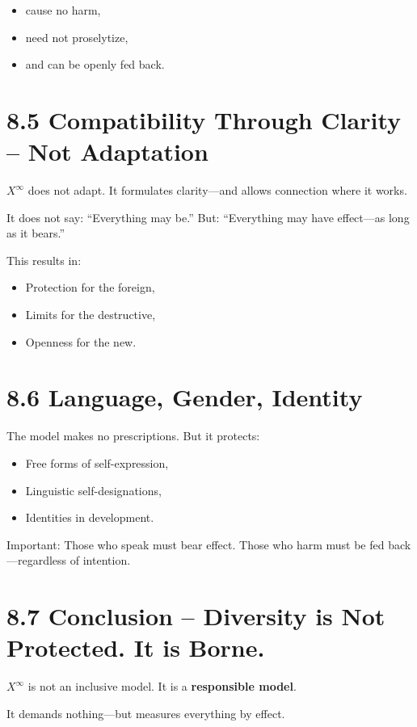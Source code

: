 \documentclass[12pt,a4paper]{book}
\begin{document}
\begin{itemize}
    \item cause no harm,
    \item need not proselytize,
    \item and can be openly fed back.
\end{itemize}

\section*{8.5 Compatibility Through Clarity – Not Adaptation}

$X^\infty$ does not adapt.  
It formulates clarity—and allows connection where it works.

It does not say: “Everything may be.”  
But: “Everything may have effect—as long as it bears.”

This results in:

\begin{itemize}
    \item Protection for the foreign,
    \item Limits for the destructive,
    \item Openness for the new.
\end{itemize}

\section*{8.6 Language, Gender, Identity}

The model makes no prescriptions.  
But it protects:

\begin{itemize}
    \item Free forms of self-expression,
    \item Linguistic self-designations,
    \item Identities in development.
\end{itemize}

Important: Those who speak must bear effect.  
Those who harm must be fed back—regardless of intention.

\section*{8.7 Conclusion – Diversity is Not Protected. It is Borne.}

$X^\infty$ is not an inclusive model.  
It is a \textbf{responsible model}.

It demands nothing—but measures everything by effect.
\end{document}
